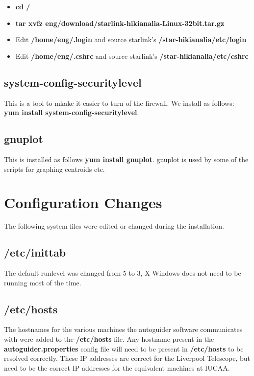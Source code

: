 \documentclass[10pt,a4paper]{article}
\begin{document}
\begin{itemize}
\item {\bf cd /}
\item {\bf tar xvfz \mytilde eng/download/starlink-hikianalia-Linux-32bit.tar.gz}
\item Edit {\bf /home/eng/.login} and source starlink's {\bf /star-hikianalia/etc/login}
\item Edit {\bf /home/eng/.cshrc} and source starlink's {\bf /star-hikianalia/etc/cshrc}
\end{itemize}

\subsection{system-config-securitylevel}

This is a tool to mkake it easier to turn of the firewall. We install as follows:
 {\bf yum install system-config-securitylevel}.

\subsection{gnuplot}

This is installed as follows {\bf yum install gnuplot}. gnuplot is used by some of the scripts
for graphing centroids etc.

\section{Configuration Changes}

The following system files were edited or changed during the installation.

\subsection{/etc/inittab}

The default runlevel was changed from 5 to 3, X Windows does not need to be running most of the time.

\subsection{/etc/hosts}

The hostnames for the various machines the autoguider software communicates with were added to the {\bf /etc/hosts} file. Any hostname present in the {\bf autoguider.properties} config file will need to be present in {\bf /etc/hosts} to be resolved correctly. These IP addresses are correct for the Liverpool Telescope, but need to be the correct IP addresses for the equivalent machines at IUCAA.
\end{document}

